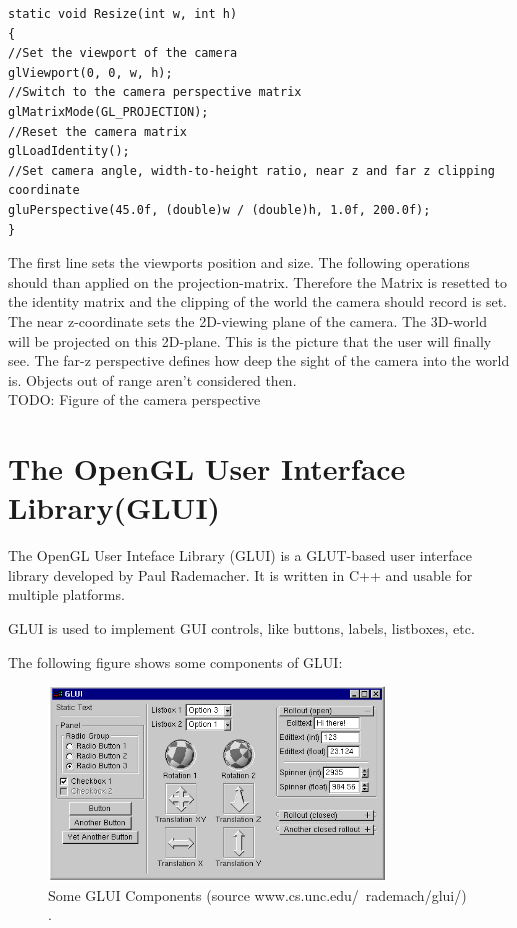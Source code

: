 \documentclass[10pt,a4paper,DIV=11]{scrreprt}
\begin{document}
\begin{lstlisting}[caption={Resize camera perspective on window resize},label=lst:glut-resize]
static void Resize(int w, int h)
{
//Set the viewport of the camera
glViewport(0, 0, w, h);
//Switch to the camera perspective matrix
glMatrixMode(GL_PROJECTION); 
//Reset the camera matrix
glLoadIdentity();
//Set camera angle, width-to-height ratio, near z and far z clipping coordinate
gluPerspective(45.0f, (double)w / (double)h, 1.0f, 200.0f);
}
\end{lstlisting}

The first line sets the viewports position and size. The following operations should than applied on the projection-matrix. Therefore the Matrix is resetted to the identity matrix and the clipping of the world the camera should record is set. The near z-coordinate sets the 2D-viewing plane of the camera. The 3D-world will be projected on this 2D-plane. This is the picture that the user will finally see. The far-z perspective defines how deep the sight of the camera into the world is. Objects out of range aren't considered then. \\

TODO: Figure of the camera perspective

\section{The OpenGL User Interface Library(GLUI)}
The OpenGL User Inteface Library (GLUI) is a GLUT-based user interface library developed by Paul Rademacher. It is written in C++ and usable for multiple platforms.

GLUI is used to implement GUI controls, like buttons, labels, listboxes, etc.

The following figure shows some components of GLUI:

\begin{center}
	\begin{figure}[H]
		\centering
		\includegraphics[width=0.8\textwidth,scale=1.0]{files/glui.png}  
		\caption{Some GLUI Components (source www.cs.unc.edu/~rademach/glui/) \cite{ogl-glui}.}
		\label{fig:ogl-glui}
	\end{figure}
\end{center}
\end{document}
